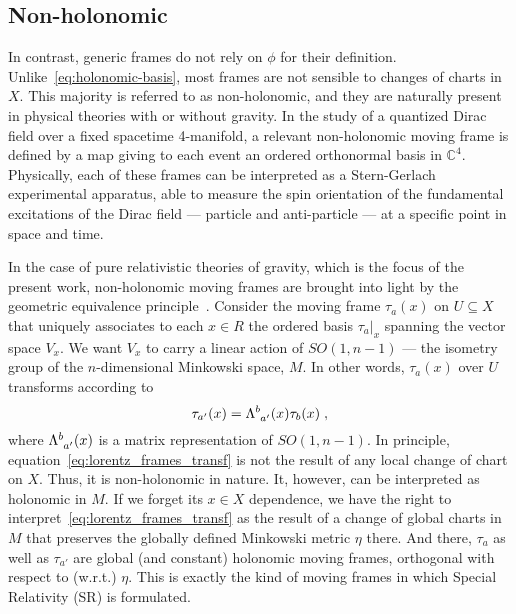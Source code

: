 \documentclass[../../main.tex]{subfiles}
\begin{document}
\subsection{Non-holonomic}\label{ssec:non-holonomic}

In contrast, generic frames do not rely on $\phi$ for their definition. Unlike~\eqref{eq:holonomic-basis}, most frames are not sensible to changes of charts in $X$. This majority is referred to as non-holonomic, and they are naturally present in physical theories with or without gravity. In the study of a quantized Dirac field over a fixed spacetime 4-manifold, a relevant non-holonomic moving frame is defined by a map giving to each event an ordered orthonormal basis in $\mathbb{C}^4$. Physically, each of these frames can be interpreted as a Stern-Gerlach experimental apparatus, able to measure the spin orientation of the fundamental excitations of the Dirac field --- particle and anti-particle --- at a specific point in space and time.

In the case of pure relativistic theories of gravity, which is the focus of the present work, non-holonomic moving frames are brought into light by the geometric equivalence principle~\cite{sardanashvily1983}. Consider the moving frame $\tau_a(x)$ on $ U \subseteq X $ that uniquely associates to each $ x \in R $ the ordered basis $ \tau_a|_x $ spanning the vector space $ V_x $. We want $ V_x $ to carry a linear action of $ SO \left( 1, n-1 \right) $ --- the isometry group of the $n$-dimensional Minkowski space, $ M $. In other words, $ \tau_a(x) $ over $U$ transforms according to
\begin{equation}
  \label{eq:lorentz_frames_transf}
  {\tau}_{a'}(x) = \tensor{\Lambda}{^b_{a'}}(x)\tau_b(x) \;,
\end{equation}
where $\tensor{\Lambda}{^b_{a'}}(x)$ is a matrix representation of $SO(1,n-1)$. In principle, equation~\eqref{eq:lorentz_frames_transf} is not the result of any local change of chart on $X$. Thus, it is non-holonomic in nature. It, however, can be interpreted as holonomic in $M$. If we forget its $x\in X$ dependence, we have the right to interpret~\eqref{eq:lorentz_frames_transf} as the result of a change of global charts in $M$ that preserves the globally defined Minkowski metric $\eta$ there. And there, $\tau_a$ as well as $\tau_{a'}$ are global (and constant) holonomic moving frames, orthogonal with respect to (w.r.t.) $\eta$. This is exactly the kind of moving frames in which Special Relativity (SR) is formulated.
\end{document}
